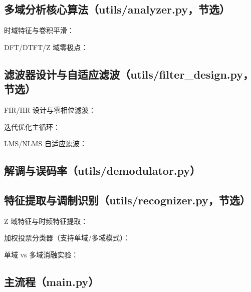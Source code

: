 \documentclass[12pt, a4paper, UTF8]{ctexart}
\begin{document}
\subsection{多域分析核心算法（utils/analyzer.py，节选）}
时域特征与卷积平滑：

DFT/DTFT/Z 域零极点：


\subsection{滤波器设计与自适应滤波（utils/filter\_design.py，节选）}
FIR/IIR 设计与零相位滤波：

迭代优化主循环：

LMS/NLMS 自适应滤波：


\subsection{解调与误码率（utils/demodulator.py）}


\subsection{特征提取与调制识别（utils/recognizer.py，节选）}
Z 域特征与时频特征提取：

加权投票分类器（支持单域/多域模式）：

单域 vs 多域消融实验：


\subsection{主流程（main.py）}

\end{document}
